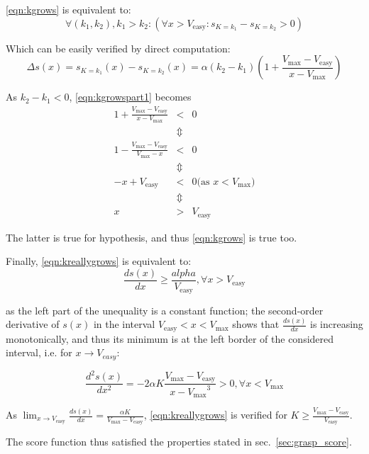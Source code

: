 \ref{eqn:kgrows} is equivalent to:
\begin{equation} \label{eqn:kgrowspart1}
 \forall (k_1,k_2), k_1 > k_2 : \left( \forall x > V_{\text{easy}} :
 s_{K=k_1} - s_{K=k_2} > 0 \right)
\end{equation}
      
Which can be easily verified by direct computation:
\begin{equation}
\Delta s(x) = s_{K=k_1}(x)-s_{K=k_2}(x) = \alpha (k_2-k_1)\left(1+\frac{V_{\text{max}}-V_{\text{easy}}}{x-V_{\text{max}}}\right)
\end{equation}

As $k_2-k_1 < 0$, \ref{eqn:kgrowspart1} becomes
\begin{equation}
\begin{array}{rcl}
1+\frac{V_{\text{max}}-V_{\text{easy}}}{x-V_{\text{max}}} & < & 0 \\
 & \Updownarrow & \\
1-\frac{V_{\text{max}}-V_{\text{easy}}}{V_{\text{max}}-x} & < & 0 \\
 & \Updownarrow & \\
-x+V_{\text{easy}} & < & 0 \text{(as } x<V_{\text{max}} \text{)} \\
 & \Updownarrow & \\
 x & > & V_{\text{easy}}
 \end{array}
\end{equation}

The latter is true for hypothesis, and thus \ref{eqn:kgrows} is true
too.

Finally, \ref{eqn:kreallygrows} is equivalent to:
\begin{equation}
\frac{ds(x)}{dx} \geq \frac{alpha}{V_{\text{easy}}}, \forall x > V_{\text{easy}}
\end{equation}

as the left part of the unequality is a constant function; the
second-order derivative of $s(x)$ in the interval $V_{\text{easy}} < x < V_{\text{max}}$
shows that $\frac{ds(x)}{dx}$ is increasing monotonically, and thus
its minimum is at the left border of the considered interval, i.e. for
$x\rightarrow V_{easy}$:

\begin{equation}
  \frac{d^2 s(x)}{d x^2} = -2 \alpha K \frac{V_{\text{max}}-V_{\text{easy}}}{{x-V_{\text{max}}}^3} >
  0, \forall x < V_{\text{max}}
\end{equation}

As $\lim_{x \rightarrow V_{\text{easy}}}\frac{ds(x)}{dx} = \frac{\alpha
K}{V_{\text{max}}-V_{\text{easy}}}$, \ref{eqn:kreallygrows} is verified for $K \geq \frac{V_{\text{max}}-V_{\text{easy}}}{V_{\text{easy}}}$.

The score function thus satisfied the properties stated in sec.~\ref{sec:grasp_score}.
